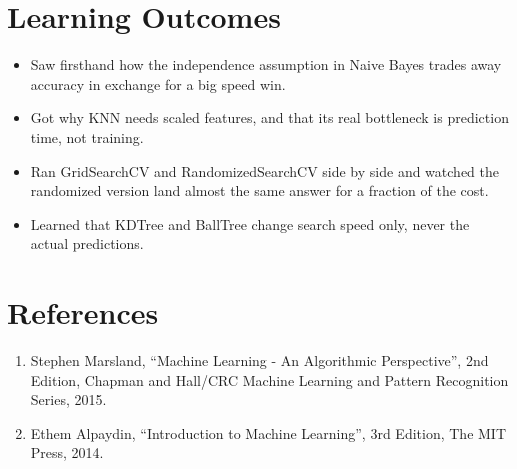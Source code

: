 \documentclass[12pt,a4paper]{article}
\begin{document}
\section{Learning Outcomes}
\begin{itemize}
\item Saw firsthand how the independence assumption in Naive Bayes trades away accuracy in exchange
for a big speed win.
\item Got why KNN needs scaled features, and that its real bottleneck is prediction time, not training.
\item Ran GridSearchCV and RandomizedSearchCV side by side and watched the randomized version land
almost the same answer for a fraction of the cost.
\item Learned that KDTree and BallTree change search speed only, never the actual predictions.
\end{itemize}

\section{References}
\begin{enumerate}
\item Stephen Marsland, ``Machine Learning - An Algorithmic Perspective'', 2nd Edition, Chapman and
Hall/CRC Machine Learning and Pattern Recognition Series, 2015.
\item Ethem Alpaydin, ``Introduction to Machine Learning'', 3rd Edition, The MIT Press, 2014.
\end{enumerate}
\end{document}

